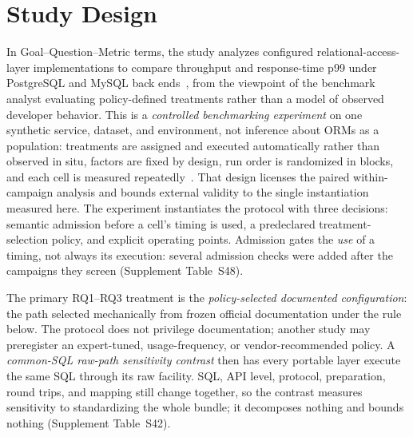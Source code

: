 \section{Study Design}
\label{sec:methodology}

In Goal--Question--Metric terms, the study analyzes configured relational-access-layer implementations to compare throughput and response-time p99 under PostgreSQL and MySQL back ends~\cite{basili1988tame}, from the viewpoint of the benchmark analyst evaluating policy-defined treatments rather than a model of observed developer behavior.
This is a \emph{controlled benchmarking experiment} on one synthetic service, dataset, and environment, not inference about ORMs as a population: treatments are assigned and executed automatically rather than observed in situ, factors are fixed by design, run order is randomized in blocks, and each cell is measured repeatedly~\cite{wohlin2012experimentation,kitchenham2002guidelines}.
That design licenses the paired within-campaign analysis and bounds external validity to the single instantiation measured here.
The experiment instantiates the protocol with three decisions: semantic admission before a cell's timing is used, a predeclared treatment-selection policy, and explicit operating points.
Admission gates the \emph{use} of a timing, not always its execution: several admission checks were added after the campaigns they screen (Supplement Table~S48).

The primary RQ1--RQ3 treatment is the \emph{policy-selected documented configuration}: the path selected mechanically from frozen official documentation under the rule below.
The protocol does not privilege documentation; another study may preregister an expert-tuned, usage-frequency, or vendor-recommended policy.
A \emph{common-SQL raw-path sensitivity contrast} then has every portable layer execute the same SQL through its raw facility.
SQL, API level, protocol, preparation, round trips, and mapping still change together, so the contrast measures sensitivity to standardizing the whole bundle; it decomposes nothing and bounds nothing (Supplement Table~S42).

